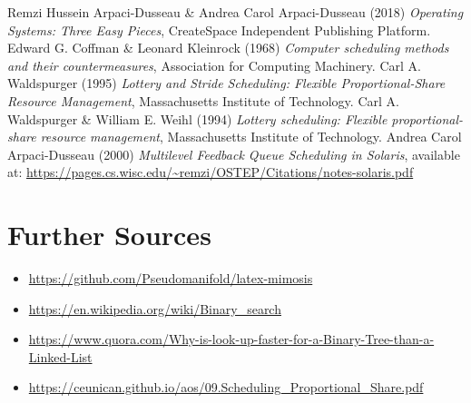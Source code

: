 \documentclass{mimosis}
\begin{document}
\begin{thebibliography}{99}
    Remzi Hussein Arpaci-Dusseau \& Andrea Carol Arpaci-Dusseau (2018) \emph{Operating Systems: Three Easy Pieces}, CreateSpace Independent Publishing Platform.
    Edward G. Coffman \& Leonard Kleinrock (1968) \emph{Computer scheduling methods and their countermeasures}, Association for Computing Machinery.
    Carl A. Waldspurger (1995) \emph{Lottery and Stride Scheduling: Flexible Proportional-Share Resource Management}, Massachusetts Institute of Technology.
    Carl A. Waldspurger \& William E. Weihl (1994) \emph{Lottery scheduling: Flexible proportional-share resource management}, Massachusetts Institute of Technology.
    Andrea Carol Arpaci-Dusseau (2000) \emph{Multilevel Feedback Queue Scheduling in Solaris}, available at: \url{https://pages.cs.wisc.edu/~remzi/OSTEP/Citations/notes-solaris.pdf}
\end{thebibliography}

\section*{Further Sources}
\begin{itemize}
    \item \url{https://github.com/Pseudomanifold/latex-mimosis}
    \item \url{https://en.wikipedia.org/wiki/Binary_search}
    \item \url{https://www.quora.com/Why-is-look-up-faster-for-a-Binary-Tree-than-a-Linked-List}
    \item \url{https://ceunican.github.io/aos/09.Scheduling_Proportional_Share.pdf}
\end{itemize}
\end{document}
